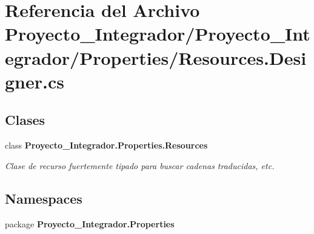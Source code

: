 \section{Referencia del Archivo Proyecto\-\_\-\-Integrador/\-Proyecto\-\_\-\-Integrador/\-Properties/\-Resources.Designer.\-cs}
\label{_proyecto___integrador_2_properties_2_resources_8_designer_8cs}
\subsection*{Clases}
\begin{DoxyCompactItemize}
\item 
class {\bf Proyecto\-\_\-\-Integrador.\-Properties.\-Resources}
\begin{DoxyCompactList}\small\item\em Clase de recurso fuertemente tipado para buscar cadenas traducidas, etc. \end{DoxyCompactList}\end{DoxyCompactItemize}
\subsection*{Namespaces}
\begin{DoxyCompactItemize}
\item 
package {\bf Proyecto\-\_\-\-Integrador.\-Properties}
\end{DoxyCompactItemize}
